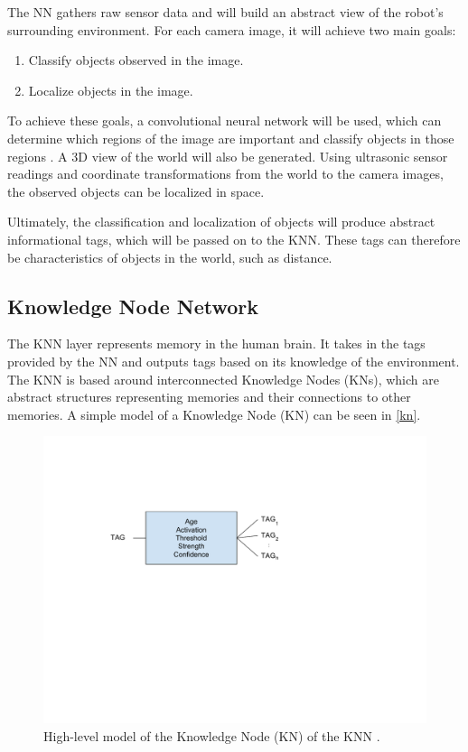 \documentclass[titlepage,11pt]{article}
\newcommand{\ar}[1]{\autoref{#1}}
\begin{document}
The NN gathers raw sensor data and will build an abstract view of the robot's surrounding environment. For each camera image, it will achieve two main goals:

\begin{enumerate}
	\item Classify objects observed in the image.
	\item Localize objects in the image.
\end{enumerate}

To achieve these goals, a convolutional neural network will be used, which can determine which regions of the image are important and classify objects in those regions \cite{conv}. A 3D view of the world will also be generated. Using ultrasonic sensor readings and coordinate transformations from the world to the camera images, the observed objects can be localized in space.

Ultimately, the classification and localization of objects will produce abstract informational tags, which will be passed on to the KNN. These tags can therefore be characteristics of objects in the world, such as distance.

\subsection{Knowledge Node Network}

The KNN layer represents memory in the human brain. It takes in the tags provided by the NN and outputs tags based on its knowledge of the environment. The KNN is based around interconnected Knowledge Nodes (KNs), which are abstract structures representing memories and their connections to other memories. A simple model of a Knowledge Node (KN) can be seen in \ar{kn}.

\begin{figure}[!htb]
	\includegraphics[width=\columnwidth]{figures/kn.pdf}
	\caption[High-level model of the Knowledge Node of the KNN.]
	{High-level model of the Knowledge Node (KN) of the KNN \cite{vybihal-knowledge}.}
	\label{kn}
\end{figure}
\end{document}
